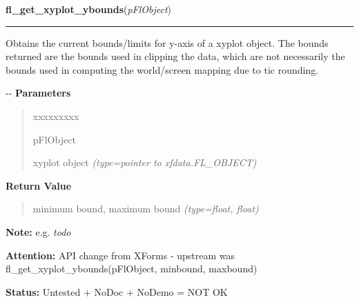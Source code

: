     \vspace{0.5ex}

\hspace{.8\funcindent}\begin{boxedminipage}{\funcwidth}

    \raggedright \textbf{fl\_get\_xyplot\_ybounds}(\textit{pFlObject})

    \vspace{-1.5ex}

    \rule{\textwidth}{0.5\fboxrule}
\setlength{\parskip}{2ex}

Obtains the current bounds/limits for y-axis of a xyplot object. The
bounds returned are the bounds used in clipping the data, which are not
necessarily the bounds used in computing the world/screen mapping due to
tic rounding.

-{}-
\setlength{\parskip}{1ex}
      \textbf{Parameters}
      \vspace{-1ex}

      \begin{quote}
        \begin{Ventry}{xxxxxxxxx}

          \item[pFlObject]


xyplot object
            {\it (type=pointer to xfdata.FL\_OBJECT)}

        \end{Ventry}

      \end{quote}

      \textbf{Return Value}
    \vspace{-1ex}

      \begin{quote}

minimum bound, maximum bound
      {\it (type=float, float)}

      \end{quote}

\textbf{Note:} 
e.g. \emph{todo}


\textbf{Attention:} 
API change from XForms - upstream was
fl\_get\_xyplot\_ybounds(pFlObject, minbound, maxbound)


\textbf{Status:} 
Untested + NoDoc + NoDemo = NOT OK


    \end{boxedminipage}

    \label{xformslib:flxyplot:fl_get_xyplot}

